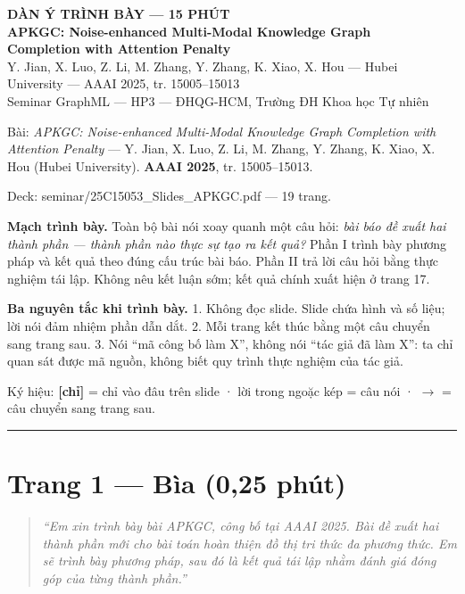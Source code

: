 \documentclass[11pt,a4paper]{article}
\newcommand{\code}[1]{{\ttfamily\small\color{codetext}#1}}
\begin{document}
\begin{center}
  {\sffamily\LARGE\bfseries\color{hcmusblue} DÀN Ý TRÌNH BÀY --- 15 PHÚT}\\[8pt]
  {\sffamily\large\bfseries APKGC: Noise-enhanced Multi-Modal Knowledge Graph\\
   Completion with Attention Penalty}\\[6pt]
  {\small Y. Jian, X. Luo, Z. Li, M. Zhang, Y. Zhang, K. Xiao, X. Hou ---
   Hubei University --- AAAI 2025, tr. 15005--15013}\\[4pt]
  {\small Seminar GraphML --- HP3 --- ĐHQG-HCM, Trường ĐH Khoa học Tự nhiên}
\end{center}
\medskip
Bài: \emph{APKGC: Noise-enhanced Multi-Modal Knowledge Graph Completion with Attention Penalty} --- Y. Jian, X. Luo, Z. Li, M. Zhang, Y. Zhang, K. Xiao, X. Hou (Hubei University). \textbf{AAAI 2025}, tr. 15005--15013.


Deck: \code{seminar/25C15053\_Slides\_APKGC.pdf} --- 19 trang.


\textbf{Mạch trình bày.} Toàn bộ bài nói xoay quanh một câu hỏi: \emph{bài báo đề xuất hai thành phần --- thành phần nào thực sự tạo ra kết quả?} Phần I trình bày phương pháp và kết quả theo đúng cấu trúc bài báo. Phần II trả lời câu hỏi bằng thực nghiệm tái lập. Không nêu kết luận sớm; kết quả chính xuất hiện ở trang 17.


\textbf{Ba nguyên tắc khi trình bày.} 1. Không đọc slide. Slide chứa hình và số liệu; lời nói đảm nhiệm phần dẫn dắt. 2. Mỗi trang kết thúc bằng một câu chuyển sang trang sau. 3. Nói ``mã công bố làm X'', không nói ``tác giả đã làm X'': ta chỉ quan sát được mã nguồn, không biết quy trình thực nghiệm của tác giả.


Ký hiệu: \textbf{[chỉ]} = chỉ vào đâu trên slide · lời trong ngoặc kép = câu nói · \textbf{$\to$} = câu chuyển sang trang sau.


\medskip\noindent\rule{\linewidth}{0.3pt}\medskip

\section*{Trang 1 --- Bìa (0,25 phút)}

\begin{quote}\itshape ``Em xin trình bày bài APKGC, công bố tại AAAI 2025. Bài đề xuất hai thành phần mới cho bài toán hoàn thiện đồ thị tri thức đa phương thức. Em sẽ trình bày phương pháp, sau đó là kết quả tái lập nhằm đánh giá đóng góp của từng thành phần.''\end{quote}
\end{document}
